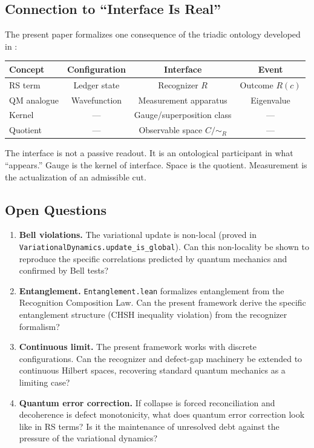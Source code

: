 \documentclass[11pt,a4paper]{article}
\theoremstyle{plain}
\theoremstyle{definition}
\theoremstyle{remark}
\begin{document}
\subsection{Connection to ``Interface Is Real''}

The present paper formalizes one consequence of the triadic ontology developed in \cite{Washburn-Interface}:

\begin{center}
\begin{tabular}{@{}lccc@{}}
\toprule
\textbf{Concept} & \textbf{Configuration} & \textbf{Interface} & \textbf{Event} \\
\midrule
RS term & Ledger state & Recognizer $R$ & Outcome $R(c)$ \\
QM analogue & Wavefunction & Measurement apparatus & Eigenvalue \\
Kernel & --- & Gauge/superposition class & --- \\
Quotient & --- & Observable space $C/{\sim_R}$ & --- \\
\bottomrule
\end{tabular}
\end{center}

The interface is not a passive readout.
It is an ontological participant in what ``appears.''
Gauge is the kernel of interface.
Space is the quotient.
Measurement is the actualization of an admissible cut.

\subsection{Open Questions}

\begin{enumerate}[nosep]
\item \textbf{Bell violations.}
The variational update is non-local (proved in \texttt{VariationalDynamics.update\_is\_global}).
Can this non-locality be shown to reproduce the specific correlations predicted by quantum mechanics and confirmed by Bell tests?

\item \textbf{Entanglement.}
\texttt{Entanglement.lean} formalizes entanglement from the Recognition Composition Law.
Can the present framework derive the specific entanglement structure (CHSH inequality violation) from the recognizer formalism?

\item \textbf{Continuous limit.}
The present framework works with discrete configurations.
Can the recognizer and defect-gap machinery be extended to continuous Hilbert spaces, recovering standard quantum mechanics as a limiting case?

\item \textbf{Quantum error correction.}
If collapse is forced reconciliation and decoherence is defect monotonicity, what does quantum error correction look like in RS terms?
Is it the maintenance of unresolved debt against the pressure of the variational dynamics?
\end{enumerate}
\end{document}
